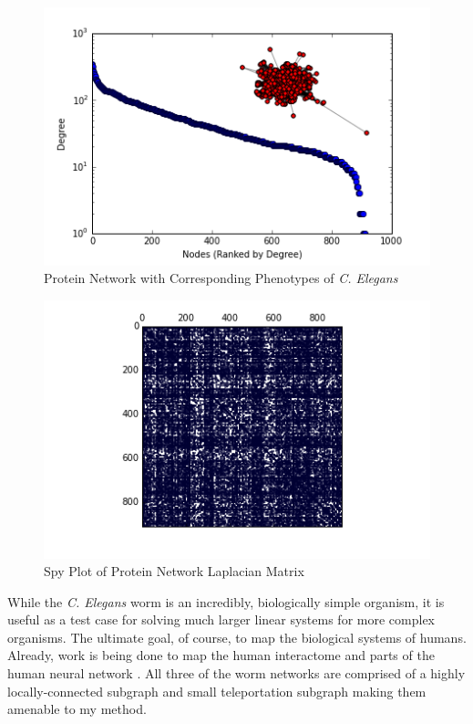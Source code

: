\documentclass{article}
\begin{document}
\begin{figure}
\centering

\includegraphics[width=\linewidth]{gene_degree_histogram.png}
\caption{Protein Network with Corresponding Phenotypes of \textit{C. Elegans}}
  
\end{figure}

\begin{figure}
\centering
\includegraphics[width = \linewidth]{genespy.png}
\caption{Spy Plot of Protein Network Laplacian Matrix}
\end{figure}

While the \textit{C. Elegans} worm is an incredibly, biologically simple organism, it is useful as a test case for solving much larger linear systems for more complex organisms. The ultimate goal, of course, to map the biological systems of humans. Already, work is being done to map the human interactome \cite{Rual:2005,Rolland:2014} and parts of the human neural network \cite{Toga:2012}. All three of the worm networks are comprised of a highly locally-connected subgraph and small teleportation subgraph making them amenable to my method. 
\end{document}
